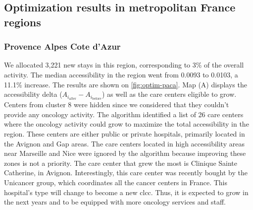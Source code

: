 \subsection{Optimization results in metropolitan France regions}

\subsubsection{Provence Alpes Cote d'Azur}

We allocated 3,221 new stays in this region, corresponding to 3\% of the overall
activity. The median accessibility in the region went from 0.0093 to 0.0103, a
11.1\% increase. The results are shown on \cref{fig:optim-paca}. Map (A)
displays the accessibility delta ($A_{i_\text{after}} - A_{i_\text{before}}$) as
well as the care centers eligible to grow. Centers from cluster 8 were hidden
since we considered that they couldn't provide any oncology activity. The
algorithm identified a list of 26 care centers where the oncology activity could
grow to maximize the total accessibility in the region. These centers are either
public or private hospitals, primarily located in the Avignon and Gap areas. The
care centers located in high accessibility areas near Marseille and Nice were
ignored by the algorithm because improving these zones is not a priority. The
care center that grew the most is Clinique Sainte Catherine, in Avignon.
Interestingly, this care center was recently bought by the Unicancer group,
which coordinates all the cancer centers in France. This hospital's type will
change to become a new \ac{clcc}. Thus, it is expected to grow in the next years
and to be equipped with more oncology services and staff.


